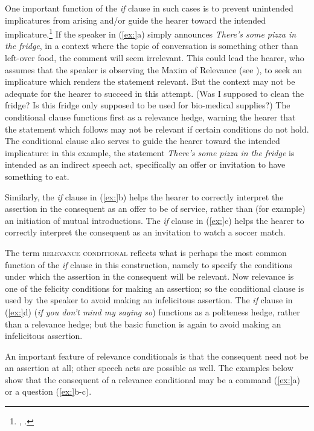 One important function of the \textit{if} clause in such cases is to prevent unintended implicatures from arising and/or guide the hearer toward the intended implicature.\footnote{\citet{DeRoseGrandy1999}, \citet{Franke2008}.} If the speaker in (\ref{ex:}a) simply announces \textit{There’s some pizza in the fridge}, in a context where the topic of conversation is something other than left-over food, the comment will seem irrelevant. This could lead the hearer, who assumes that the speaker is observing the Maxim of Relevance (see ), to seek an implicature which renders the statement relevant. But the context may not be adequate for the hearer to succeed in this attempt. (Was I supposed to clean the fridge? Is this fridge only supposed to be used for bio-medical supplies?) The conditional clause functions first as a relevance hedge, warning the hearer that the statement which follows may not be relevant if certain conditions do not hold. The conditional clause also serves to guide the hearer toward the intended implicature: in this example, the statement \textit{There’s some pizza in the fridge} is intended as an indirect speech act, specifically an offer or invitation to have something to eat.



Similarly, the \textit{if} clause in (\ref{ex:}b) helps the hearer to correctly interpret the assertion in the consequent as an offer to be of service, rather than (for example) an initiation of mutual introductions. The \textit{if} clause in (\ref{ex:}c) helps the hearer to correctly interpret the consequent as an invitation to watch a soccer match.



The term \textsc{relevance conditional} reflects what is perhaps the most common function of the \textit{if} clause in this construction, namely to specify the conditions under which the assertion in the consequent will be relevant. Now relevance is one of the felicity conditions for making an assertion; so the conditional clause is used by the speaker to avoid making an infelicitous assertion. The \textit{if} clause in (\ref{ex:}d) (\textit{if you don’t mind my saying so}) functions as a politeness hedge, rather than a relevance hedge; but the basic function is again to avoid making an infelicitous assertion.



An important feature of relevance conditionals is that the consequent need not be an assertion at all; other speech acts are possible as well. The examples below show that the consequent of a relevance conditional may be a command (\ref{ex:}a) or a question (\ref{ex:}b-c). 


